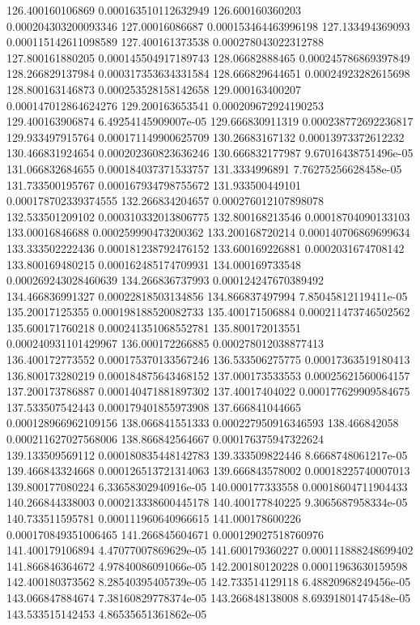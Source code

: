 {126.400160106869 0.000163510112632949
126.600160360203 0.000204303200093346
127.00016086687 0.000153464463996198
127.133494369093 0.000115142611098589
127.400161373538 0.000278043022312788
127.800161880205 0.000145504917189743
128.06682888465 0.000245786869397849
128.266829137984 0.000317353634331584
128.666829644651 0.00024923282615698
128.800163146873 0.000253528158142658
129.000163400207 0.000147012864624276
129.200163653541 0.000209672924190253
129.400163906874 6.49254145909007e-05
129.666830911319 0.000238772692236817
129.933497915764 0.000171149900625709
130.26683167132 0.00013973372612232
130.466831924654 0.000202360823636246
130.666832177987 9.67016438751496e-05
131.066832684655 0.000184037371533757
131.3334996891 7.76275256628458e-05
131.733500195767 0.000167934798755672
131.933500449101 0.000178702339374555
132.266834204657 0.000276012107898078
132.533501209102 0.000310332013806775
132.800168213546 0.00018704090133103
133.00016846688 0.000259990473200362
133.200168720214 0.000140706869699634
133.333502222436 0.000181238792476152
133.600169226881 0.0002031674708142
133.800169480215 0.000162485174709931
134.000169733548 0.000269243028460639
134.266836737993 0.000124247670389492
134.466836991327 0.00022818503134856
134.866837497994 7.85045812119411e-05
135.20017125355 0.000198188520082733
135.400171506884 0.000211473746502562
135.600171760218 0.000241351068552781
135.800172013551 0.000240931101429967
136.000172266885 0.000278012038877413
136.400172773552 0.000175370133567246
136.533506275775 0.00017363519180413
136.800173280219 0.000184875643468152
137.000173533553 0.00025621560064157
137.200173786887 0.000140471881897302
137.40017404022 0.000177629909584675
137.533507542443 0.000179401855973908
137.666841044665 0.000128966962109156
138.066841551333 0.000227950916346593
138.466842058 0.000211627027568006
138.866842564667 0.000176375947322624
139.133509569112 0.000180835448142783
139.333509822446 8.6668748061217e-05
139.466843324668 0.000126513721314063
139.666843578002 0.00018225740007013
139.800177080224 6.33658302940916e-05
140.000177333558 0.00018604711904433
140.266844338003 0.000213338600445178
140.400177840225 9.3065687958334e-05
140.733511595781 0.000111960640966615
141.000178600226 0.000170849351006465
141.266845604671 0.000129027518760976
141.400179106894 4.47077007869629e-05
141.600179360227 0.000111888248699402
141.866846364672 4.97840086091066e-05
142.200180120228 0.00011963630159598
142.400180373562 8.28540395405739e-05
142.733514129118 6.48820968249456e-05
143.066847884674 7.38160829778374e-05
143.266848138008 8.69391801474548e-05
143.533515142453 4.86535651361862e-05
}
